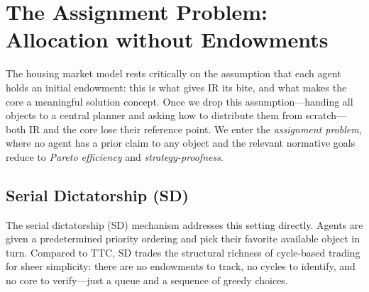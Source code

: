 \section{The Assignment Problem: Allocation without Endowments}

The housing market model rests critically on the assumption that each
agent holds an initial endowment: this is what gives IR its bite, and
what makes the core a meaningful solution concept. Once we drop this
assumption---handing all objects to a central planner and asking how to
distribute them from scratch---both IR and the core lose their reference
point. We enter the \textit{assignment problem}, where no agent has a
prior claim to any object and the relevant normative goals reduce to
\textit{Pareto efficiency} and \textit{strategy-proofness}.

\subsection{Serial Dictatorship (SD)}

The serial dictatorship (SD) mechanism addresses this setting directly.
Agents are given a predetermined priority ordering and pick their
favorite available object in turn. Compared to TTC, SD trades the
structural richness of cycle-based trading for sheer simplicity: there
are no endowments to track, no cycles to identify, and no core to
verify---just a queue and a sequence of greedy choices.


